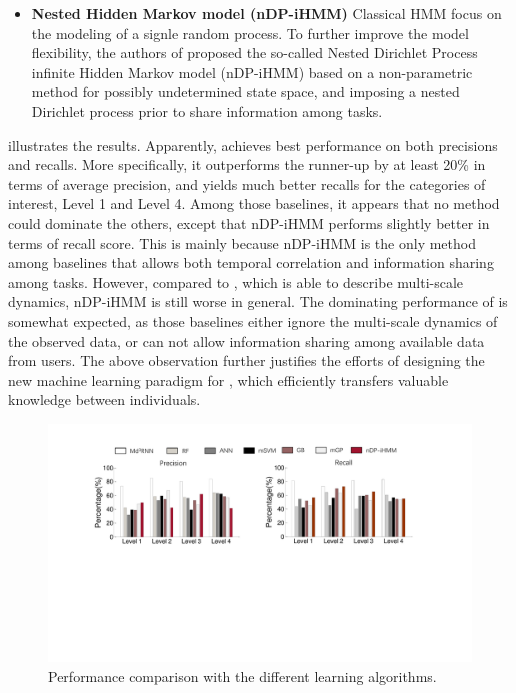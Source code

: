 {\begin{itemize}
  \item
  \textbf{Nested Hidden Markov model (nDP-iHMM)}
  Classical HMM focus on the modeling of a signle random process. To further improve the model flexibility, the authors of \cite{ni2007multi} proposed the so-called Nested Dirichlet Process infinite Hidden Markov model (nDP-iHMM) based on a non-parametric method for possibly undetermined state space, and imposing a nested Dirichlet process prior to share information among tasks.
\end{itemize}

 illustrates the results.
Apparently, \modelname achieves best performance on both precisions and recalls.
More specifically, it outperforms the runner-up by at least 20\% in terms of average precision, and yields much better recalls for the categories of interest, \ie Level 1 and Level 4.
Among those baselines, it appears that no method could dominate the others, except that nDP-iHMM performs slightly better in terms of recall score.
This is mainly because nDP-iHMM is the only method among baselines that allows both temporal correlation and information sharing among tasks.
However, compared to \modelname, which is able to describe multi-scale dynamics, nDP-iHMM is still worse in general.
The dominating performance of \modelname is somewhat expected, as those baselines either ignore the multi-scale dynamics of the observed data, or can not allow information sharing among available data from users.
The above observation further justifies the efforts of designing the new machine learning paradigm for \sysname, which efficiently transfers valuable knowledge between individuals.
}
\begin{figure}[h]
  \centering
  \includegraphics[width=0.8\columnwidth]{./img/Model_CMP1.pdf}
  \caption{Performance comparison with the different learning algorithms.}
  \label{fig:cmp_models}
\end{figure}


